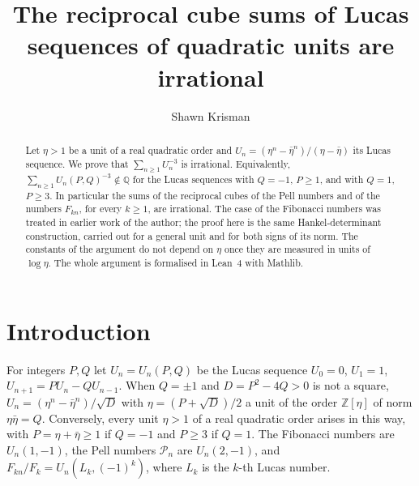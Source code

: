 \documentclass[11pt]{amsart}
\theoremstyle{definition}
\theoremstyle{remark}
\numberwithin{equation}{section}
\newcommand{\ZZ}{\mathbb{Z}}
\newcommand{\QQ}{\mathbb{Q}}
\newcommand{\cP}{\mathcal{P}}
\begin{document}
\title[Reciprocal cubes of Lucas sequences]{The reciprocal cube sums of Lucas sequences of quadratic units are
irrational}

\author{Shawn Krisman}


\begin{abstract}
Let $\eta>1$ be a unit of a real quadratic order and $U_n=(\eta^n-\bar\eta^n)/(\eta-\bar\eta)$ its Lucas sequence. We
prove that $\sum_{n\ge1}U_n^{-3}$ is irrational. Equivalently, $\sum_{n\ge1}U_n(P,Q)^{-3}\notin\QQ$ for the Lucas
sequences with $Q=-1$, $P\ge1$, and with $Q=1$, $P\ge3$. In particular the sums of the reciprocal cubes of the Pell
numbers and of the numbers $F_{kn}$, for every $k\ge1$, are irrational. The case of the Fibonacci numbers was treated in
earlier work of the author; the proof here is the same Hankel-determinant construction, carried out for a general unit
and for both signs of its norm. The constants of the argument do not depend on $\eta$ once they are measured in units
of $\log\eta$. The whole argument is formalised in Lean~4 with Mathlib.
\end{abstract}

\maketitle

\section{Introduction}

For integers $P,Q$ let $U_n=U_n(P,Q)$ be the Lucas sequence $U_0=0$, $U_1=1$, $U_{n+1}=PU_n-QU_{n-1}$. When $Q=\pm1$
and $D=P^2-4Q>0$ is not a square, $U_n=(\eta^n-\bar\eta^n)/\sqrt D$ with $\eta=(P+\sqrt D)/2$ a unit of the order
$\ZZ[\eta]$ of norm $\eta\bar\eta=Q$. Conversely, every unit $\eta>1$ of a real quadratic order arises in this way, with
$P=\eta+\bar\eta\ge1$ if $Q=-1$ and $P\ge3$ if $Q=1$. The Fibonacci numbers are $U_n(1,-1)$, the Pell numbers $\cP_n$ are
$U_n(2,-1)$, and $F_{kn}/F_k=U_n(L_k,(-1)^k)$, where $L_k$ is the $k$-th Lucas number.
\end{document}

